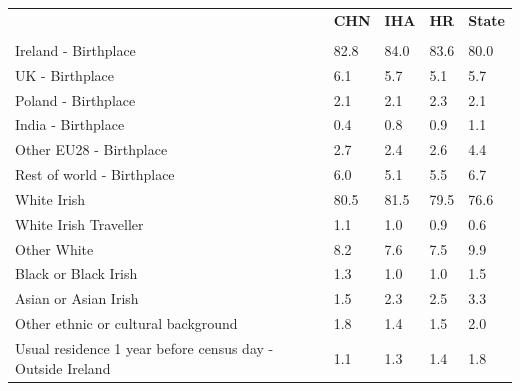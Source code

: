 \documentclass{article}
\begin{document}
\pagebreak
\begin{table}[h]	
\centering
		\begin{tabular}{KTTTT}
  \hline
& \textbf{CHN} & \textbf{IHA} & \textbf{HR}& \textbf{State}\\ 
  \hline
    \\ 
    \hline
Ireland - Birthplace & 82.8& 84.0& 83.6& 80.0\\
UK - Birthplace & 6.1& 5.7& 5.1& 5.7\\
Poland - Birthplace & 2.1& 2.1& 2.3& 2.1\\
India - Birthplace & 0.4& 0.8& 0.9& 1.1\\
Other EU28 - Birthplace & 2.7& 2.4& 2.6& 4.4\\
Rest of world - Birthplace & 6.0& 5.1& 5.5& 6.7\\
    \hline
White Irish & 80.5& 81.5& 79.5& 76.6\\
White Irish Traveller & 1.1& 1.0& 0.9& 0.6\\
Other White & 8.2& 7.6& 7.5& 9.9\\
Black or Black Irish & 1.3& 1.0& 1.0& 1.5\\
Asian or Asian Irish & 1.5& 2.3& 2.5& 3.3\\
Other ethnic or cultural background & 1.8& 1.4& 1.5& 2.0\\
    \hline
Usual residence 1 year before census day - Outside Ireland & 1.1& 1.3& 1.4& 1.8\\


\end{tabular}
\end{table}
\end{document}
